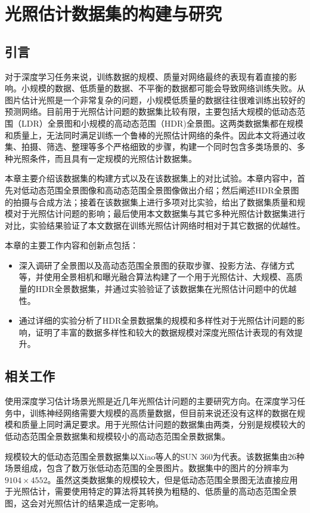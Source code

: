 \chapter{光照估计数据集的构建与研究}\label{chap:dataset}
\section{引言}
对于深度学习任务来说，训练数据的规模、质量对网络最终的表现有着直接的影响。小规模的数据、低质量的数据、不平衡的数据都可能会导致网络训练失败。从图片估计光照是一个非常复杂的问题，小规模低质量的数据往往很难训练出较好的预测网络。目前用于光照估计问题的数据集比较有限，主要包括大规模的低动态范围（LDR）全景图和小规模的高动态范围（HDR)全景图。这两类数据集都在规模和质量上，无法同时满足训练一个鲁棒的光照估计网络的条件。因此本文将通过收集、拍摄、筛选、整理等多个严格细致的步骤，构建一个同时包含多类场景的、多种光照条件，而且具有一定规模的光照估计数据集。

本章主要介绍该数据集的构建方式以及在该数据集上的对比试验。本章内容中，首先对低动态范围全景图像和高动态范围全景图像做出介绍；然后阐述HDR全景图的拍摄与合成方法；接着在该数据集上进行多项对比实验，给出了数据集质量和规模对于光照估计问题的影响；最后使用本文数据集与其它多种光照估计数据集进行对比，实验结果验证了本文数据在训练光照估计网络时相对于其它数据的优越性。

本章的主要工作内容和创新点包括：
\begin{itemize}
    \item 深入调研了全景图以及高动态范围全景图的获取步骤、投影方法、存储方式等，并使用全景相机和曝光融合算法构建了一个用于光照估计、大规模、高质量的HDR全景数据集，并通过实验验证了该数据集在光照估计问题中的优越性。
    \item 通过详细的实验分析了HDR全景数据集的规模和多样性对于光照估计问题的影响，证明了丰富的数据多样性和较大的数据规模对深度光照估计表现的有效提升。
\end{itemize}
\section{相关工作}
使用深度学习估计场景光照是近几年光照估计问题的主要研究方向。在深度学习任务中，训练神经网络需要大规模的高质量数据，但目前来说还没有这样的数据在规模和质量上同时满足要求。用于光照估计问题的数据集由两类，分别是规模较大的低动态范围全景数据集和规模较小的高动态范围全景数据集。

规模较大的低动态范围全景数据集以Xiao等人的SUN 360\cite{xiao2012recognizing}为代表。该数据集由26种场景组成，包含了数万张低动态范围的全景图片。数据集中的图片的分辨率为$9104\times4552$。虽然这类数据集的规模较大，但是低动态范围全景图无法直接应用于光照估计，需要使用特定的算法将其转换为粗糙的、低质量的高动态范围全景图，这会对光照估计的结果造成一定影响。

